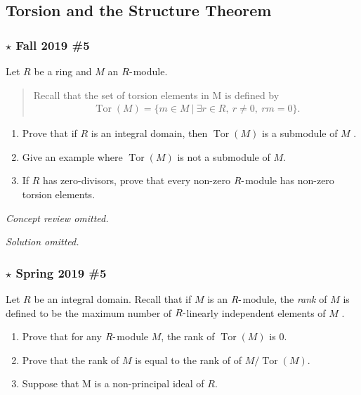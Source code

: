 \hypertarget{torsion-and-the-structure-theorem}{%
\subsection{Torsion and the Structure
Theorem}\label{torsion-and-the-structure-theorem}}

\hypertarget{star-fall-2019-5}{%
\subsubsection{\texorpdfstring{\(\star\) Fall 2019
\#5}{\textbackslash star Fall 2019 \#5}}\label{star-fall-2019-5}}

Let \(R\) be a ring and \(M\) an \(R{\hbox{-}}\)module.

\begin{quote}
Recall that the set of torsion elements in M is defined by
\begin{align*}
\operatorname{Tor}(M) = \{m \in M {~\mathrel{\Big\vert}~}\exists r \in R, ~r \neq 0, ~rm = 0\}
.\end{align*}
\end{quote}

\begin{enumerate}
\def\labelenumi{\alph{enumi}.}
\item
  Prove that if \(R\) is an integral domain, then
  \(\operatorname{Tor}(M )\) is a submodule of \(M\) .
\item
  Give an example where \(\operatorname{Tor}(M )\) is not a submodule of
  \(M\).
\item
  If \(R\) has zero-divisors, prove that every non-zero
  \(R{\hbox{-}}\)module has non-zero torsion elements.
\end{enumerate}

\emph{Concept review omitted.}

\emph{Solution omitted.}

\hypertarget{star-spring-2019-5}{%
\subsubsection{\texorpdfstring{\(\star\) Spring 2019
\#5}{\textbackslash star Spring 2019 \#5}}\label{star-spring-2019-5}}

Let \(R\) be an integral domain. Recall that if \(M\) is an
\(R{\hbox{-}}\)module, the \emph{rank} of \(M\) is defined to be the
maximum number of \(R{\hbox{-}}\)linearly independent elements of \(M\)
.

\begin{enumerate}
\def\labelenumi{\alph{enumi}.}
\item
  Prove that for any \(R{\hbox{-}}\)module \(M\), the rank of
  \(\operatorname{Tor}(M )\) is 0.
\item
  Prove that the rank of \(M\) is equal to the rank of of
  \(M/\operatorname{Tor}(M )\).
\item
  Suppose that M is a non-principal ideal of \(R\).
\end{enumerate}

